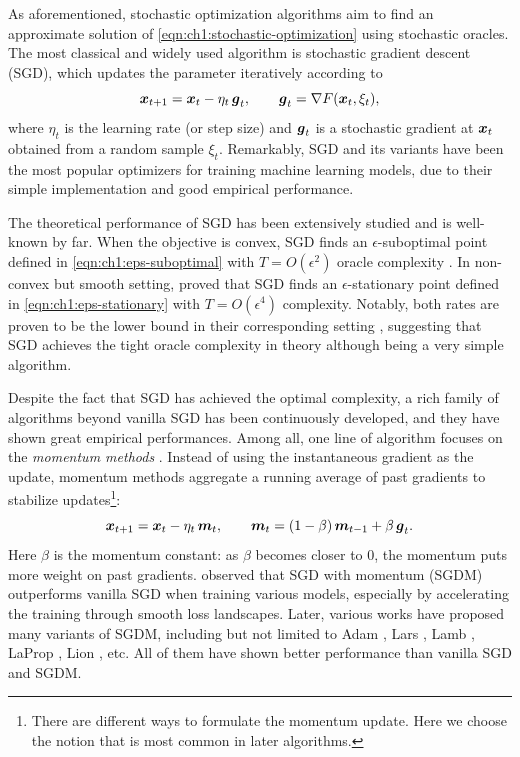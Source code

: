 As aforementioned, stochastic optimization algorithms aim to find an approximate solution of \eqref{eqn:ch1:stochastic-optimization} using stochastic oracles. The most classical and widely used algorithm is stochastic gradient descent (SGD), which updates the parameter iteratively according to
\begin{equation}
    {\boldsymbol{x}}_{t+1} = {\boldsymbol{x}}_t - \eta_t \, {\boldsymbol{g}}_t, \qquad {\boldsymbol{g}}_t = \nabla F({\boldsymbol{x}}_t, \xi_t),
    \label{eqn:ch1:sgd-update}
\end{equation}
where $\eta_t$ is the learning rate (or step size) and ${\boldsymbol{g}}_t$ is a stochastic gradient at ${\boldsymbol{x}}_t$ obtained from a random sample $\xi_t$. Remarkably, SGD and its variants have been the most popular optimizers for training machine learning models, due to their simple implementation and good empirical performance.

The theoretical performance of SGD has been extensively studied and is well-known by far. When the objective is convex, SGD finds an $\epsilon$-suboptimal point defined in \eqref{eqn:ch1:eps-suboptimal} with $T=O(\epsilon^2)$ oracle complexity \citep{zinkevich2003online}. In non-convex but smooth setting, \cite{ghadimi2013stochastic} proved that SGD finds an $\epsilon$-stationary point defined in \eqref{eqn:ch1:eps-stationary} with $T=O(\epsilon^4)$ complexity. Notably, both rates are proven to be the lower bound in their corresponding setting \citep{nesterov2013introductory,bubeck2015convex,arjevani2022lower}, suggesting that SGD achieves the tight oracle complexity in theory although being a very simple algorithm. 

Despite the fact that SGD has achieved the optimal complexity, a rich family of algorithms beyond vanilla SGD has been continuously developed, and they have shown great empirical performances. Among all, one line of algorithm focuses on the \emph{momentum methods} \citep{polyak1964speeding,sutskever2013importance}. Instead of using the instantaneous gradient as the update, momentum methods aggregate a running average of past gradients to stabilize updates\footnote{There are different ways to formulate the momentum update. Here we choose the notion that is most common in later algorithms.}:
\begin{equation}
    {\boldsymbol{x}}_{t+1} = {\boldsymbol{x}}_t - \eta_t\, {\boldsymbol{m}}_t,
    \qquad {\boldsymbol{m}}_t = (1-\beta)\, {\boldsymbol{m}}_{t-1} + \beta\, {\boldsymbol{g}}_t.
    \label{eqn:ch1:momentum-update}
\end{equation}
Here $\beta$ is the momentum constant: as $\beta$ becomes closer to $0$, the momentum puts more weight on past gradients. \cite{sutskever2013importance} observed that SGD with momentum (SGDM) outperforms vanilla SGD when training various models, especially by accelerating the training through smooth loss landscapes. Later, various works have proposed many variants of SGDM, including but not limited to Adam \citep{kingma2014adam}, Lars \citep{you2017scaling}, Lamb \citep{you2019large}, LaProp \citep{ziyin2020laprop}, Lion \citep{chen2023symbolic}, etc. All of them have shown better performance than vanilla SGD and SGDM.

